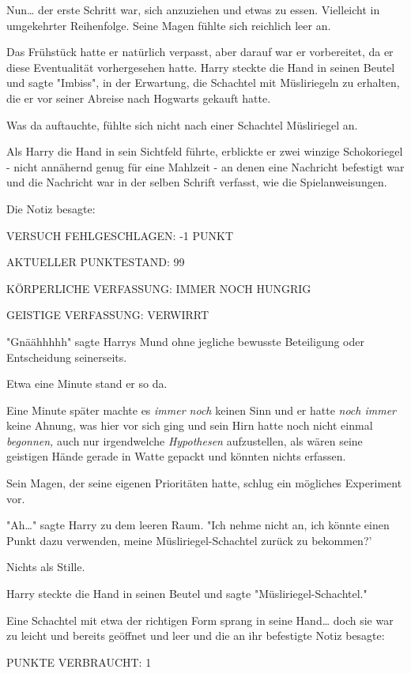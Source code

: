 {Nun… der erste Schritt war, sich anzuziehen und etwas zu essen. Vielleicht in umgekehrter Reihenfolge. Seine Magen fühlte sich reichlich leer an.

Das Frühstück hatte er natürlich verpasst, aber darauf war er vorbereitet, da er diese Eventualität vorhergesehen hatte. Harry steckte die Hand in seinen Beutel und sagte "Imbiss", in der Erwartung, die Schachtel mit Müsliriegeln zu erhalten, die er vor seiner Abreise nach Hogwarts gekauft hatte.

Was da auftauchte, fühlte sich nicht nach einer Schachtel Müsliriegel an.

Als Harry die Hand in sein Sichtfeld führte, erblickte er zwei winzige Schokoriegel - nicht annähernd genug für eine Mahlzeit - an denen eine Nachricht befestigt war und die Nachricht war in der selben Schrift verfasst, wie die Spielanweisungen.

Die Notiz besagte:

VERSUCH FEHLGESCHLAGEN: -1 PUNKT

AKTUELLER PUNKTESTAND: 99

KÖRPERLICHE VERFASSUNG: IMMER NOCH HUNGRIG

GEISTIGE VERFASSUNG: VERWIRRT

"Gnäähhhhh" sagte Harrys Mund ohne jegliche bewusste Beteiligung oder Entscheidung seinerseits.

Etwa eine Minute stand er so da.

Eine Minute später machte es \emph{immer noch} keinen Sinn und er hatte \emph{noch immer} keine Ahnung, was hier vor sich ging und sein Hirn hatte noch nicht einmal \emph{begonnen,} auch nur irgendwelche \emph{Hypothesen} aufzustellen, als wären seine geistigen Hände gerade in Watte gepackt und könnten nichts erfassen.

Sein Magen, der seine eigenen Prioritäten hatte, schlug ein mögliches Experiment vor.

"Ah…" sagte Harry zu dem leeren Raum. "Ich nehme nicht an, ich könnte einen Punkt dazu verwenden, meine Müsliriegel-Schachtel zurück zu bekommen?'

Nichts als Stille.

Harry steckte die Hand in seinen Beutel und sagte "Müsliriegel-Schachtel."

Eine Schachtel mit etwa der richtigen Form sprang in seine Hand… doch sie war zu leicht und bereits geöffnet und leer und die an ihr befestigte Notiz besagte:

PUNKTE VERBRAUCHT: 1

}

